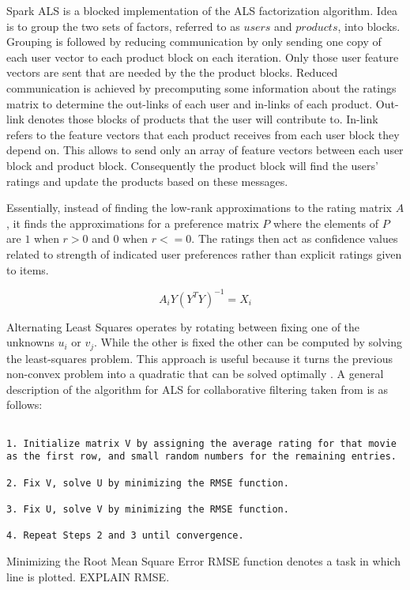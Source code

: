 \documentclass[main.tex]{thesis.tex}
\begin{document}
Spark ALS is a blocked implementation of the ALS factorization algorithm.
Idea is to group the two sets of factors, referred to as $users$ and $products$, into blocks.
Grouping is followed by reducing communication by only sending one copy of each user vector to each product block on each iteration.
Only those user feature vectors are sent that are needed by the the product blocks.
Reduced communication is achieved by precomputing some information about the ratings matrix to determine the out-links of each user and in-links of each product.
Out-link denotes those blocks of products that the user will contribute to.
In-link refers to the feature vectors that each product receives from each user block they depend on.
This allows to send only an array of feature vectors between each user block and product block.
Consequently the product block will find the users' ratings and update the products based on these messages. \cite{als14}

Essentially, instead of finding the low-rank approximations to the rating matrix $A$, it finds the approximations for a preference matrix $P$ where the elements of $P$ are $1$ when $r > 0$ and $0$ when $r <= 0$.
The ratings then act as confidence values related to strength of indicated user preferences rather than explicit ratings given to items. \cite{als14}

\begin{equation}
A_iY(Y^T Y)^{-1} = X_i
\end{equation}

Alternating Least Squares operates by rotating between fixing one of the unknowns $u_i$ or $v_j$.
While the other is fixed the other can be computed by solving the least-squares problem.
This approach is useful because it turns the previous non-convex problem into a quadratic that can be solved optimally \cite{aberger14}.
A general description of the algorithm for ALS for collaborative filtering taken from \cite{aberger14} is as follows:

\begin{lstlisting}[caption=Alternating Least Squares algorithm \cite{aberger14}]

1. Initialize matrix V by assigning the average rating for that movie as the first row, and small random numbers for the remaining entries.

2. Fix V, solve U by minimizing the RMSE function.

3. Fix U, solve V by minimizing the RMSE function.

4. Repeat Steps 2 and 3 until convergence.

\end{lstlisting}

Minimizing the Root Mean Square Error RMSE function denotes a task in which line is plotted. EXPLAIN RMSE.
\end{document}
